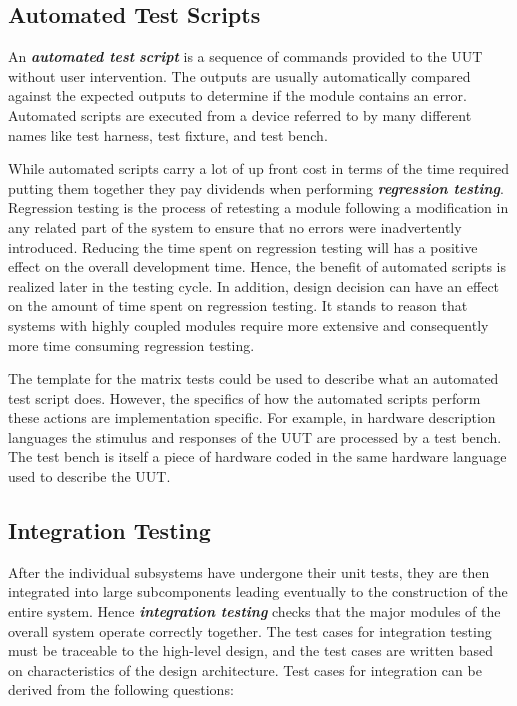 \subsection*{Automated Test Scripts}
\label{subsection:automated-test-scripts}

An \emph{\textbf{automated test}} \emph{\textbf{script}} is a sequence
of commands provided to the UUT without user intervention. The outputs
are usually automatically compared against the expected outputs to
determine if the module contains an error. Automated scripts are
executed from a device referred to by many different names like test
harness, test fixture, and test bench.

While automated scripts carry a lot of up front cost in terms of the
time required putting them together they pay dividends when performing
\emph{\textbf{regression testing}}. Regression testing is the process of
retesting a module following a modification in any related part of the
system to ensure that no errors were inadvertently introduced. Reducing
the time spent on regression testing will has a positive effect on the
overall development time. Hence, the benefit of automated scripts is
realized later in the testing cycle. In addition, design decision can
have an effect on the amount of time spent on regression testing. It
stands to reason that systems with highly coupled modules require more
extensive and consequently more time consuming regression testing.

The template for the matrix tests could be used to describe what an
automated test script does. However, the specifics of how the automated
scripts perform these actions are implementation specific. For example,
in hardware description languages the stimulus and responses of the UUT
are processed by a test bench. The test bench is itself a piece of
hardware coded in the same hardware language used to describe the UUT.

\subsection{Integration Testing}
\label{subsection:integration-testing}

After the individual subsystems have undergone their unit tests, they
are then integrated into large subcomponents leading eventually to the
construction of the entire system. Hence \emph{\textbf{integration
testing}} checks that the major modules of the overall system operate
correctly together. The test cases for integration testing must be
traceable to the high-level design, and the test cases are written based
on characteristics of the design architecture. Test cases for
integration can be derived from the following questions:

